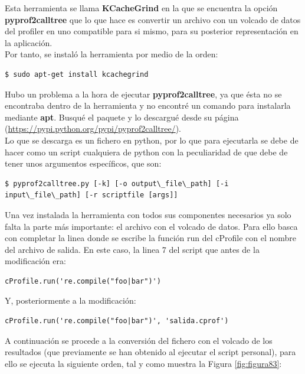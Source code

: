Esta herramienta se llama \textbf{KCacheGrind} \cite{enlace10} en la que se encuentra la opción \textbf{pyprof2calltree} que lo que hace es convertir un archivo con un volcado de datos del profiler en uno compatible para si mismo, para su posterior representación en la aplicación.
\\

Por tanto, se instaló la herramienta por medio de la orden:
\begin{lstlisting}[style=fich]
$ sudo apt-get install kcachegrind
\end{lstlisting}


Hubo un problema a la hora de ejecutar \textbf{pyprof2calltree}, ya que ésta no se encontraba dentro de la herramienta y no encontré un comando para instalarla mediante \textbf{apt}.
Busqué el paquete y lo descargué desde su página (\url{https://pypi.python.org/pypi/pyprof2calltree/}). \\

Lo que se descarga es un fichero en python, por lo que para ejecutarla se debe de hacer como un script cualquiera de python con la peculiaridad de que debe de tener unos argumentos específicos, que son:
\begin{lstlisting}[style=fich]
$ pyprof2calltree.py [-k] [-o output\_file\_path] [-i input\_file\_path] [-r scriptfile [args]]
\end{lstlisting}

Una vez instalada la herramienta con todos sus componentes necesarios ya solo falta la parte más importante: el archivo con el volcado de datos.
Para ello basca con completar la linea donde se escribe la función run del cProfile con el nombre del archivo de salida. En este caso, la linea 7 del script que antes de la modificación era:

\begin{lstlisting}[style=fich]
cProfile.run('re.compile("foo|bar")')
\end{lstlisting}

Y, posteriormente a la modificación:

\begin{lstlisting}[style=fich]
cProfile.run('re.compile("foo|bar")', 'salida.cprof')
\end{lstlisting}


A continuación se procede a la conversión del fichero con el volcado de los resultados (que previamente se han obtenido al ejecutar el script personal), para ello se ejecuta la siguiente orden, tal y como muestra la Figura \ref{fig:figura83}:

